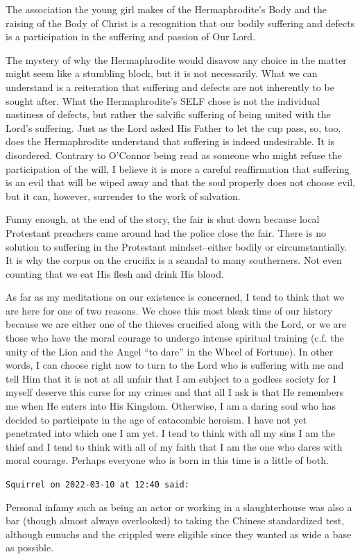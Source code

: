 \begin{footnotesize}
\begin{sffamily}
The association the young girl makes of the Hermaphrodite's Body and the raising of the Body of Christ is a recognition that our bodily suffering and defects is a participation in the suffering and passion of Our Lord.

The mystery of why the Hermaphrodite would disavow any choice in the matter might seem like a stumbling block, but it is not necessarily. What we can understand is a reiteration that suffering and defects are not inherently to be sought after. What the Hermaphrodite's SELF chose is not the individual nastiness of defects, but rather the salvific suffering of being united with the Lord's suffering. Just as the Lord asked His Father to let the cup pass, so, too, does the Hermaphrodite understand that suffering is indeed undesirable. It is disordered. Contrary to O'Connor being read as someone who might refuse the participation of the will, I believe it is more a careful reaffirmation that suffering is an evil that will be wiped away and that the soul properly does not choose evil, but it can, however, surrender to the work of salvation.

Funny enough, at the end of the story, the fair is shut down because local Protestant preachers came around had the police close the fair. There is no solution to suffering in the Protestant mindset--either bodily or circumstantially. It is why the corpus on the crucifix is a scandal to many southerners. Not even counting that we eat His flesh and drink His blood.

As far as my meditations on our existence is concerned, I tend to think that we are here for one of two reasons. We chose this most bleak time of our history because we are either one of the thieves crucified along with the Lord, or we are those who have the moral courage to undergo intense spiritual training (c.f. the unity of the Lion and the Angel ``to dare'' in the Wheel of Fortune). In other words, I can choose right now to turn to the Lord who is suffering with me and tell Him that it is not at all unfair that I am subject to a godless society for I myself deserve this curse for my crimes and that all I ask is that He remembers me when He enters into His Kingdom. Otherwise, I am a daring soul who has decided to participate in the age of catacombic heroism. I have not yet penetrated into which one I am yet. I tend to think with all my sins I am the thief and I tend to think with all of my faith that I am the one who dares with moral courage. Perhaps everyone who is born in this time is a little of both.

\hfill

\texttt{Squirrel on 2022-03-10 at 12:40 said:}

Personal infamy such as being an actor or working in a slaughterhouse was also a bar (though almost always overlooked) to taking the Chinese standardized test, although eunuchs and the crippled were eligible since they wanted as wide a base as possible.

\end{sffamily}
\end{footnotesize}

